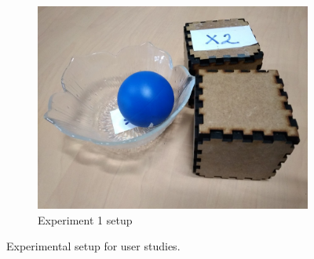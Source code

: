 \begin{figure}[htp]
\begin{subfigure}[t]{0.24\textwidth}
 	     \includegraphics[width=\textwidth]{figures/exp1-setup}%
 	     \caption{Experiment 1 setup}\label{fig:exp1-setup}%
 	   \end{subfigure} 	  
 	  \caption{Experimental setup for user studies.}
 	   \label{fig:pre-experiment}%
 \end{figure}






